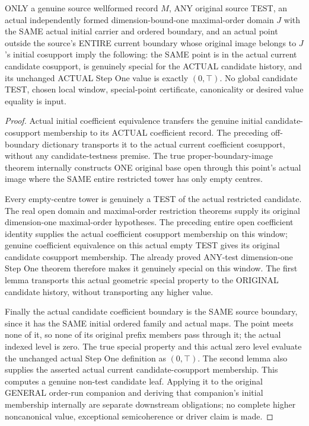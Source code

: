 \begin{theorem}
\label{hir:original-same-carrier-curve-actual-special-stepone-leaf}
\leanok
ONLY a genuine source wellformed record $M$, ANY original source TEST,
an actual independently formed dimension-bound-one maximal-order domain
$J$ with the SAME actual initial carrier and ordered boundary, and an
actual point outside the source's ENTIRE current boundary whose original
image belongs to $J$'s initial cosupport imply the following: the SAME
point is in the actual current candidate cosupport, is genuinely special
for the ACTUAL candidate history, and its unchanged ACTUAL Step One value
is exactly $(0,\top)$.
No global candidate TEST, chosen local window, special-point certificate,
canonicality or desired value equality is input.
\end{theorem}
\begin{proof}
Actual initial coefficient equivalence transfers the genuine initial
candidate-cosupport membership to its ACTUAL coefficient record. The
preceding off-boundary dictionary transports it to the actual current
coefficient cosupport, without any candidate-testness premise. The true
proper-boundary-image theorem internally constructs ONE original base
open through this point's actual image where the SAME entire restricted
tower has only empty centres.

Every empty-centre tower is genuinely a TEST of the actual restricted
candidate. The real open domain and maximal-order restriction theorems
supply its original dimension-one maximal-order hypotheses. The preceding
entire open coefficient identity supplies the actual coefficient
cosupport membership on this window; genuine coefficient equivalence
on this actual empty TEST gives its original candidate cosupport
membership. The already proved ANY-test dimension-one Step One theorem
therefore makes it genuinely special on this window. The first lemma
transports this actual geometric special property to the ORIGINAL
candidate history, without transporting any higher value.

Finally the actual candidate coefficient boundary is the SAME source
boundary, since it has the SAME initial ordered family and actual maps.
The point meets none of it, so none of its original prefix members pass
through it; the actual indexed level is zero. The true special property
and this actual zero level evaluate the unchanged actual Step One
definition as $(0,\top)$. The second lemma also supplies the asserted
actual current candidate-cosupport membership. This computes a genuine
non-test candidate leaf. Applying it to the original GENERAL order-run
companion and deriving that companion's initial membership internally are
separate downstream obligations; no complete higher noncanonical value,
exceptional semicoherence or driver claim is made.
\end{proof}
